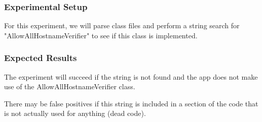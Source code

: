 \documentclass[10pt,twocolumn,pdftex]{article}
\begin{document}
    \subsubsection{Experimental Setup}
    For this experiment, we will parse class files and perform a string search for "AllowAllHostnameVerifier" to see if this class is implemented.
    
    \subsubsection{Expected Results}
    The experiment will succeed if the string is not found and the app does not make use of the AllowAllHostnameVerifier class.
    
    There may be false positives if this string is included in a section of the code that is not actually used for anything (dead code).



\cite{10.1145/2382196.2382205}
\cite{10.1145/3086467.3086469}
\end{document}
